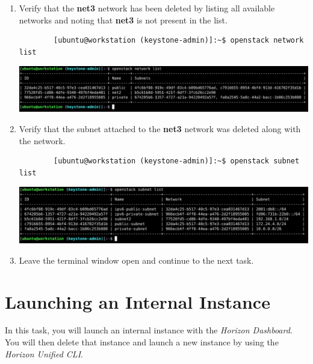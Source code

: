 \documentclass[letterpaper, 12pt]{article}
\begin{document}
\begin{enumerate}
    \item Verify that the \textbf{net3} network has been deleted by listing all available networks and noting that
    \textbf{net3} is not present in the list.
    \begin{lstlisting}
        [ubuntu@workstation (keystone-admin)]:~$ openstack network list
    \end{lstlisting}

    \begin{center}
        \includegraphics[width=\linewidth]{images/part3/step25.png}
    \end{center}

    \item Verify that the subnet attached to the \textbf{net3} network was deleted along with the network.
    \begin{lstlisting}
        [ubuntu@workstation (keystone-admin)]:~$ openstack subnet list
    \end{lstlisting}

    \begin{center}
        \includegraphics[width=\linewidth]{images/part3/step26.png}
    \end{center}

    \item Leave the terminal window open and continue to the next task.

\end{enumerate}

\section{Launching an Internal Instance}
\label{sec:launching_an_internal_instance}
In this task, you will launch an internal instance with the \textit{Horizon Dashboard}. You will then delete that
instance and launch a new instance by using the \textit{Horizon Unified CLI}.
\end{document}
